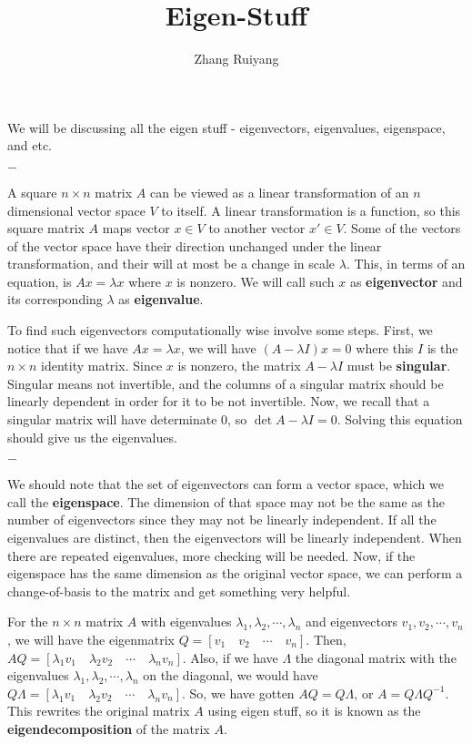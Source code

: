 \documentclass{article}
\title{Eigen-Stuff}
\author{Zhang Ruiyang}
\date{}
\theoremstyle{definition}
\newcommand{\breaking}{%
    \begin{center}
    $-$
    \end{center}%
}
\begin{document}
\maketitle

\noindent We will be discussing all the eigen stuff - eigenvectors, eigenvalues, eigenspace, and etc.

\breaking

\noindent A square $n \times n$ matrix $A$ can be viewed as a linear transformation of an $n$ dimensional vector space $V$ to itself. A linear transformation is a function, so this square matrix $A$ maps vector $x \in V$ to another vector $x' \in V$. Some of the vectors of the vector space have their direction unchanged under the linear transformation, and their will at most be a change in scale $\lambda$. This, in terms of an equation, is $Ax = \lambda x$ where $x$ is nonzero. We will call such $x$ as \textbf{eigenvector} and its corresponding $\lambda$ as \textbf{eigenvalue}. 

\bigskip

\noindent To find such eigenvectors computationally wise involve some steps. First, we notice that if we have $Ax = \lambda x$, we will have $(A - \lambda I) x = 0$ where this $I$ is the $n \times n$ identity matrix. Since $x$ is nonzero, the matrix $A - \lambda I$ must be \textbf{singular}. Singular means not invertible, and the columns of a singular matrix should be linearly dependent in order for it to be not invertible. Now, we recall that a singular matrix will have determinate 0, so $\det{A - \lambda I} = 0$. Solving this equation should give us the eigenvalues. 

\breaking

\noindent We should note that the set of eigenvectors can form a vector space, which we call the \textbf{eigenspace}. The dimension of that space may not be the same as the number of eigenvectors since they may not be linearly independent. If all the eigenvalues are distinct, then the eigenvectors will be linearly independent. When there are repeated eigenvalues, more checking will be needed. Now, if the eigenspace has the same dimension as the original vector space, we can perform a change-of-basis to the matrix and get something very helpful.

\bigskip

\noindent For the $n \times n$ matrix $A$ with eigenvalues $\lambda_1, \lambda_2, \cdots, \lambda_n$ and eigenvectors $v_1, v_2, \cdots, v_n$, we will have the eigenmatrix $Q = [ v_1 \quad v_2 \quad \cdots \quad v_n ]$. Then, $AQ = [ \lambda_1 v_1 \quad \lambda_2 v_2 \quad \cdots \quad \lambda_n v_n ]$. Also, if we have $\Lambda$ the diagonal matrix with the eigenvalues $\lambda_1, \lambda_2, \cdots, \lambda_n$ on the diagonal, we would have $Q \Lambda = [ \lambda_1 v_1 \quad \lambda_2 v_2 \quad \cdots \quad \lambda_n v_n ]$. So, we have gotten $AQ = Q\Lambda$, or $A = Q \Lambda Q^{-1}$. This rewrites the original matrix $A$ using eigen stuff, so it is known as the \textbf{eigendecomposition} of the matrix $A$.
\end{document}
